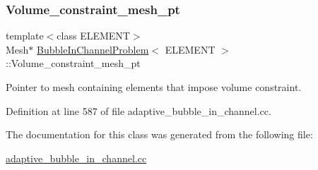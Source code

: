 \subsubsection{\texorpdfstring{Volume\+\_\+constraint\+\_\+mesh\+\_\+pt}{Volume\_constraint\_mesh\_pt}}
{\footnotesize\ttfamily template$<$class E\+L\+E\+M\+E\+NT$>$ \\
Mesh$\ast$ \hyperlink{classBubbleInChannelProblem}{Bubble\+In\+Channel\+Problem}$<$ E\+L\+E\+M\+E\+NT $>$\+::Volume\+\_\+constraint\+\_\+mesh\+\_\+pt\hspace{0.3cm}{\ttfamily [private]}}



Pointer to mesh containing elements that impose volume constraint. 



Definition at line 587 of file adaptive\+\_\+bubble\+\_\+in\+\_\+channel.\+cc.



The documentation for this class was generated from the following file\+:\begin{DoxyCompactItemize}
\item 
\hyperlink{adaptive__bubble__in__channel_8cc}{adaptive\+\_\+bubble\+\_\+in\+\_\+channel.\+cc}\end{DoxyCompactItemize}
